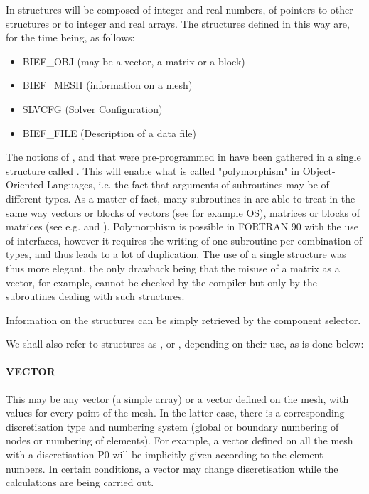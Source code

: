 In \bief structures will be composed of integer and real numbers, of pointers to
other structures or to integer and real arrays. The structures defined in this
way are, for the time being, as follows:
\begin{itemize}
\item BIEF\_OBJ (may be a vector, a matrix or a block)
\item BIEF\_MESH (information on a mesh)
\item SLVCFG (Solver Configuration)
\item BIEF\_FILE (Description of a data file)
\end{itemize}
The notions of ,  and  that were
pre-programmed in  have been gathered in a single structure called
.
This will enable what is called "polymorphism" in Object-Oriented Languages,
i.e. the fact that arguments of subroutines may be of
different types. As a matter of fact, many subroutines in \bief are able to
treat in the same way vectors or blocks of vectors (see for example OS),
matrices or blocks of matrices (see e.g.  and ).
Polymorphism is possible in FORTRAN 90 with the use of interfaces, however it
requires the writing of one subroutine per combination of types, and thus leads
to a lot of duplication. The use of a single structure  was
thus more elegant, the only drawback being that the misuse of a matrix as a
vector, for example, cannot be checked by the compiler but only by the
subroutines dealing with such structures.


Information on the structures can be simply retrieved by the component
selector.


We shall also refer to  structures as ,
 or , depending on their use, as is done below:

\paragraph{VECTOR}

This may be any vector (a simple array) or a vector defined on the mesh, with
values for every point of the mesh. In the latter case, there is a
corresponding discretisation type and numbering system (global or boundary
numbering of nodes or numbering of elements). For example, a vector defined on
all the mesh with a discretisation P0 will be implicitly given according to the
element numbers. In certain conditions, a vector may change discretisation
while the calculations are being carried out.

